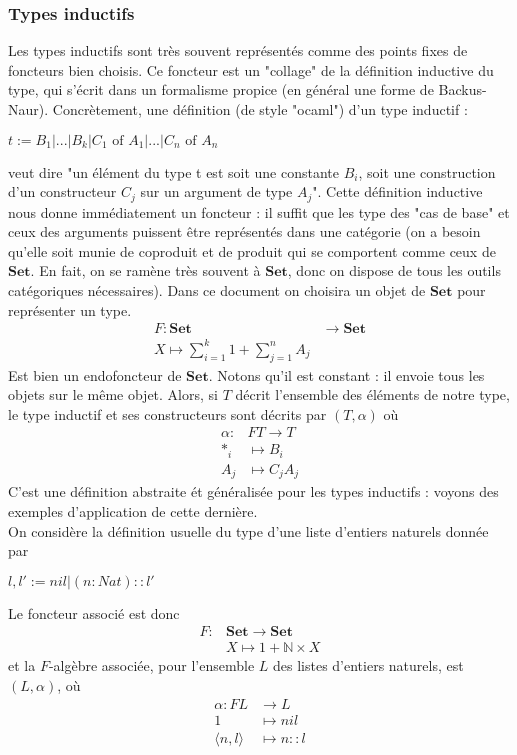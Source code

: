 \documentclass{article}
\newcommand{\N}{\mathbb{N}}
\begin{document}
\subsubsection{Types inductifs}

Les types inductifs sont très souvent représentés comme des points fixes de foncteurs bien choisis. Ce foncteur est un "collage" de la définition inductive du type, qui s'écrit dans un formalisme propice (en général une forme de Backus-Naur). Concrètement,  une définition (de style "ocaml") d'un type inductif : 
\begin{center}
    $  t := B_1 | ... | B_k | C_1 \text{ of } A_1 | ... | C_n \text{ of } A_n $
\end{center}
veut dire "un élément du type t est soit une constante $B_i$, soit une construction d'un constructeur $C_j$ sur un argument de type $A_j$". Cette définition inductive nous donne immédiatement un foncteur : il suffit que les type des "cas de base" et ceux des arguments puissent être représentés dans une catégorie (on a besoin qu'elle soit munie de coproduit et de produit qui se comportent comme ceux de $\mathbf{Set}$. En fait, on se ramène très souvent à $\mathbf{Set}$, donc on dispose de tous les outils catégoriques nécessaires). Dans ce document on choisira un objet de $\mathbf{Set}$ pour représenter un type.  
\begin{align*}
    F : \mathbf{Set} & \rightarrow \mathbf{Set} \\ 
    X \mapsto \sum_{i=1}^k 1 + \sum_{j=1}^n A_j
\end{align*}
Est bien un endofoncteur de $\mathbf{Set}$. Notons qu'il est constant : il envoie tous les objets sur le même objet. Alors, si $T$ décrit l'ensemble des éléments de notre type, le type inductif et ses constructeurs sont décrits par $(T,\alpha)$ où
\begin{align*}
    \alpha : & F T \rightarrow T  \\ 
    *_i & \mapsto B_i \\ 
    A_j & \mapsto C_j A_j
\end{align*}
C'est une définition abstraite ét généralisée pour les types inductifs : voyons des exemples d'application de cette dernière.  \\ 

On considère la définition usuelle du type d'une liste d'entiers naturels donnée par 
\begin{center}
$l,l' := nil | (n : Nat) :: l'$    
\end{center}
Le foncteur associé est donc
\begin{align*}
F : & \mathbf{Set} \rightarrow \mathbf{Set} \\       & X \mapsto 1 + \N \times X
\end{align*}
et la $F$-algèbre associée, pour l'ensemble $L$ des listes d'entiers naturels, est $(L,\alpha)$, où
\begin{align*}
\alpha :  FL &  \rightarrow L \\
          1 & \mapsto nil  \\ 
          \langle n, l \rangle & \mapsto n :: l
\end{align*}
\end{document}
